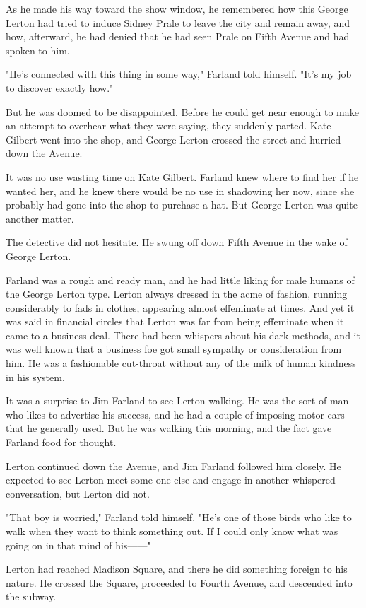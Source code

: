 \documentclass{novel}
\begin{document}
As he made his way toward the show window, he remembered how this George Lerton had tried to induce Sidney Prale to leave the city and remain away, and how, afterward, he had denied that he had seen Prale on Fifth Avenue and had spoken to him.

"He's connected with this thing in some way," Farland told himself. "It's my job to discover exactly how."

But he was doomed to be disappointed. Before he could get near enough to make an attempt to overhear what they were saying, they suddenly parted. Kate Gilbert went into the shop, and George Lerton crossed the street and hurried down the Avenue.

It was no use wasting time on Kate Gilbert. Farland knew where to find her if he wanted her, and he knew there would be no use in shadowing her now, since she probably had gone into the shop to purchase a hat. But George Lerton was quite another matter.

The detective did not hesitate. He swung off down Fifth Avenue in the wake of George Lerton.

Farland was a rough and ready man, and he had little liking for male humans of the George Lerton type. Lerton always dressed in the acme of fashion, running considerably to fads in clothes, appearing almost effeminate at times. And yet it was said in financial circles that Lerton was far from being effeminate when it came to a business deal. There had been whispers about his dark methods, and it was well known that a business foe got small sympathy or consideration from him. He was a fashionable cut-throat without any of the milk of human kindness in his system.

It was a surprise to Jim Farland to see Lerton walking. He was the sort of man who likes to advertise his success, and he had a couple of imposing motor cars that he generally used. But he was walking this morning, and the fact gave Farland food for thought.

Lerton continued down the Avenue, and Jim Farland followed him closely. He expected to see Lerton meet some one else and engage in another whispered conversation, but Lerton did not.

"That boy is worried," Farland told himself. "He's one of those birds who like to walk when they want to think something out. If I could only know what was going on in that mind of his------"

Lerton had reached Madison Square, and there he did something foreign to his nature. He crossed the Square, proceeded to Fourth Avenue, and descended into the subway.
\end{document}
